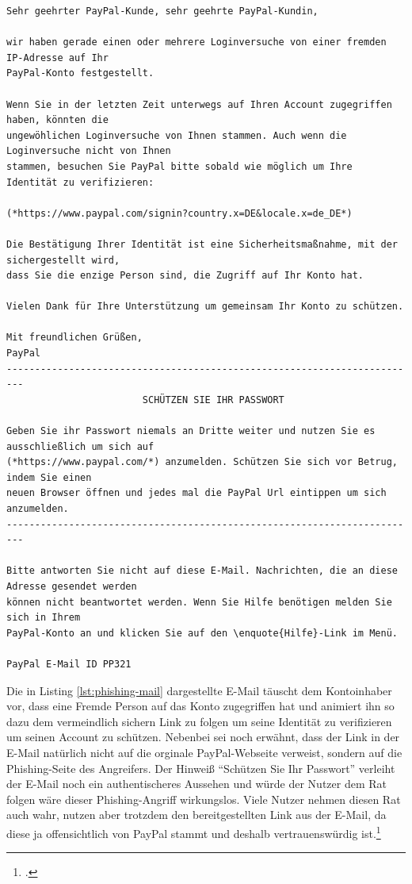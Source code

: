 \begin{scriptsize}
\begin{lstlisting}
Sehr geehrter PayPal-Kunde, sehr geehrte PayPal-Kundin,

wir haben gerade einen oder mehrere Loginversuche von einer fremden IP-Adresse auf Ihr
PayPal-Konto festgestellt.

Wenn Sie in der letzten Zeit unterwegs auf Ihren Account zugegriffen haben, könnten die
ungewöhlichen Loginversuche von Ihnen stammen. Auch wenn die Loginversuche nicht von Ihnen
stammen, besuchen Sie PayPal bitte sobald wie möglich um Ihre Identität zu verifizieren:

(*https://www.paypal.com/signin?country.x=DE&locale.x=de_DE*)

Die Bestätigung Ihrer Identität ist eine Sicherheitsmaßnahme, mit der sichergestellt wird,
dass Sie die enzige Person sind, die Zugriff auf Ihr Konto hat.

Vielen Dank für Ihre Unterstützung um gemeinsam Ihr Konto zu schützen.

Mit freundlichen Grüßen,
PayPal
-------------------------------------------------------------------------
                        SCHÜTZEN SIE IHR PASSWORT

Geben Sie ihr Passwort niemals an Dritte weiter und nutzen Sie es ausschließlich um sich auf
(*https://www.paypal.com/*) anzumelden. Schützen Sie sich vor Betrug, indem Sie einen
neuen Browser öffnen und jedes mal die PayPal Url eintippen um sich anzumelden.
-------------------------------------------------------------------------

Bitte antworten Sie nicht auf diese E-Mail. Nachrichten, die an diese Adresse gesendet werden
können nicht beantwortet werden. Wenn Sie Hilfe benötigen melden Sie sich in Ihrem
PayPal-Konto an und klicken Sie auf den \enquote{Hilfe}-Link im Menü.

PayPal E-Mail ID PP321
\end{lstlisting}
\end{scriptsize}

Die in Listing \ref{lst:phishing-mail} dargestellte E-Mail täuscht dem Kontoinhaber vor, dass eine Fremde Person auf das Konto zugegriffen hat und animiert ihn so dazu dem vermeindlich sichern Link zu folgen um seine Identität zu verifizieren um seinen Account zu schützen. Nebenbei sei noch erwähnt, dass der Link in der E-Mail natürlich nicht auf die orginale PayPal-Webseite verweist, sondern auf die Phishing-Seite des Angreifers. Der Hinweiß \enquote{Schützen Sie Ihr Passwort} verleiht der E-Mail noch ein authentischeres Aussehen und würde der Nutzer dem Rat folgen wäre dieser Phishing-Angriff wirkungslos. Viele Nutzer nehmen diesen Rat auch wahr, nutzen aber trotzdem den bereitgestellten Link aus der E-Mail, da diese ja offensichtlich von PayPal stammt und deshalb vertrauenswürdig ist.\footcite[Vgl.][10]{phishing}

